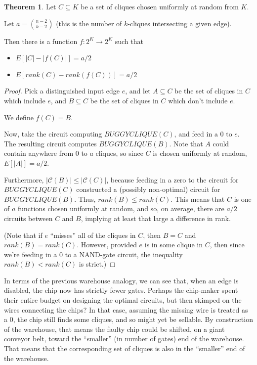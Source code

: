 \documentclass[12pt]{article}
\theoremstyle{definition}
\newtheorem{thm}{Theorem}[section]
\newcommand{\bigC}[0]{\mathcal{C}}
\begin{document}
\begin{thm}
\label{vaguelyUpward}
Let $C \subseteq K$ be a set of cliques chosen uniformly at random
from $K$.

Let $a = {n-2 \choose k-2}$ (this is the number of $k$-cliques
intersecting a given edge).

Then there is a function $f: 2^K \rightarrow 2^K$ such that
\begin{itemize}

\item $E[|C| - |f(C)|] = a/2$

\item $E[rank(C) - rank(f(C))] = a/2$

\end{itemize}

\end{thm}
\begin{proof}

Pick a distinguished input edge $e$, and let $A \subseteq C$ be
the set of cliques in $C$ which include $e$, and $B \subseteq C$ be
the set of cliques in $C$ which don't include $e$.

We define $f(C) = B$.

Now, take the circuit computing $BUGGYCLIQUE(C)$, and
feed in a 0 to $e$. The resulting circuit computes
$BUGGYCLIQUE(B)$. Note that $A$ could contain anywhere
from 0 to $a$
cliques, so since $C$ is chosen uniformly at random,
$E[|A|] = a/2$.

Furthermore, $|\bigC(B)| \le |\bigC(C)|$, because feeding in
a zero to the circuit for $BUGGYCLIQUE(C)$ constructed a
(possibly non-optimal) circuit for $BUGGYCLIQUE(B)$.
Thus, $rank(B) \le rank(C)$.
This means that
$C$ is one of $a$ functions chosen uniformly at random,
and so, on average, there are $a/2$ circuits between $C$
and $B$, implying at least that large a difference in rank.

(Note that if $e$ ``misses'' all of the cliques in $C$, then $B = C$
and $rank(B) = rank(C)$. However, provided $e$ is in some clique in $C$,
then since we're feeding in a 0 to a NAND-gate circuit,
the inequality $rank(B) < rank(C)$ is strict.)

\end{proof}

In terms of the previous warehouse analogy, we can see that,
when an edge is disabled, the chip now has strictly fewer gates.
Perhaps the chip-maker spent their entire budget on designing the
optimal circuits, but then skimped on the wires connecting the chips?
In that case, assuming the missing wire is treated as a 0, the chip still
finds some cliques, and so might yet be sellable.
By construction of the warehouse, that means the faulty chip could be shifted,
on a giant conveyor belt,
toward the ``smaller'' (in number of gates) end of the warehouse.
That means that the corresponding set of cliques is also
in the ``smaller'' end of the warehouse.
\end{document}
